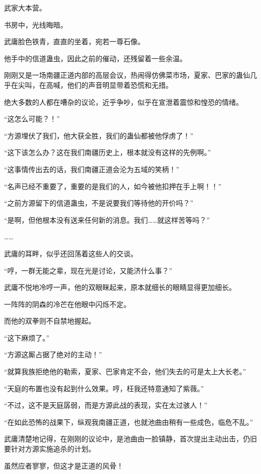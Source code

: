 
\begin{this_body}

武家大本营。

书房中，光线晦暗。

武庸脸色铁青，直直的坐着，宛若一尊石像。

他手中的信道蛊虫，因此之前的催动，还残留着一些余温。

刚刚又是一场南疆正道内部的高层会议，热闹得仿佛菜市场，夏家、巴家的蛊仙几乎在尖叫，在高喊，他们的声音明显带着恐慌和无措。

绝大多数的人都在嘈杂的议论，近乎争吵，似乎在宣泄着震惊和惶恐的情绪。

“这怎么可能？！”

“方源埋伏了我们，他大获全胜，我们的蛊仙都被他俘虏了！”

“这下该怎么办？这在我们南疆历史上，根本就没有这样的先例啊。”

“这事情传出去的话，我们南疆正道会沦为五域的笑柄！”

“名声已经不重要了，重要的是我们的人，如今被他扣押在手上啊！！”

“之前方源留下的信道蛊虫，不是说要我们等待他的开价吗？”

“是啊，但他根本没有送来任何新的消息。我们……就这样苦等吗？”

……

武庸的耳畔，似乎还回荡着这些人的交谈。

“哼，一群无能之辈，现在光是讨论，又能济什么事？”

武庸不悦地冷哼一声，他的双眼眯起来，原本就细长的眼睛显得更加细长。

一阵阵的阴森的冷芒在他眼中闪烁不定。

而他的双拳则不自禁地握起。

“这下麻烦了。”

“方源这厮占据了绝对的主动！”

“就算我族拒绝他的勒索，夏家、巴家肯定不会，他们失去的可是太上大长老。”

“天庭的布置也没有起到什么效果。哼，枉我还特意通知了紫薇。”

“不过，这不是天庭孱弱，而是方源此战的表现，实在太过骇人！”

“在如此恐怖的战果下，纵观我南疆正道，也就池曲由稍有一些成色，临危不乱。”

武庸清楚地记得，在刚刚的议论中，是池曲由一脸镇静，首次提出主动出击，仍旧要针对方源实施追杀的计划。

虽然应者寥寥，但这才是正道的风骨！


\end{this_body}
